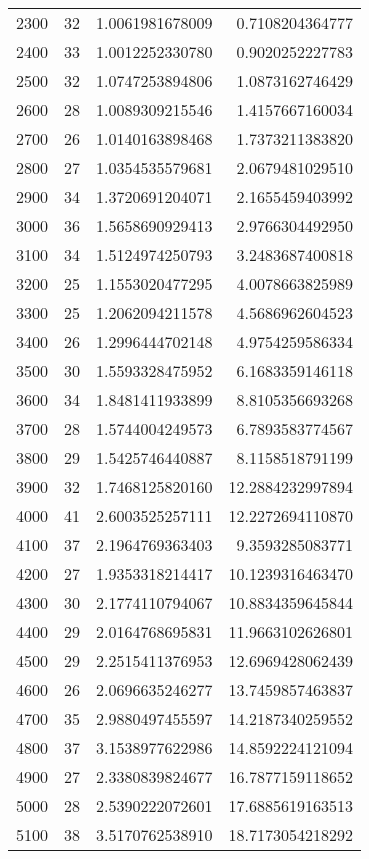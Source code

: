 \begin{longtable}{lrrr}
2300 & 32 & 1.0061981678009 & 0.7108204364777 \\
2400 & 33 & 1.0012252330780 & 0.9020252227783 \\
2500 & 32 & 1.0747253894806 & 1.0873162746429 \\
2600 & 28 & 1.0089309215546 & 1.4157667160034 \\
2700 & 26 & 1.0140163898468 & 1.7373211383820 \\
2800 & 27 & 1.0354535579681 & 2.0679481029510 \\
2900 & 34 & 1.3720691204071 & 2.1655459403992 \\
3000 & 36 & 1.5658690929413 & 2.9766304492950 \\
3100 & 34 & 1.5124974250793 & 3.2483687400818 \\
3200 & 25 & 1.1553020477295 & 4.0078663825989 \\
3300 & 25 & 1.2062094211578 & 4.5686962604523 \\
3400 & 26 & 1.2996444702148 & 4.9754259586334 \\
3500 & 30 & 1.5593328475952 & 6.1683359146118 \\
3600 & 34 & 1.8481411933899 & 8.8105356693268 \\
3700 & 28 & 1.5744004249573 & 6.7893583774567 \\
3800 & 29 & 1.5425746440887 & 8.1158518791199 \\
3900 & 32 & 1.7468125820160 & 12.2884232997894 \\
4000 & 41 & 2.6003525257111 & 12.2272694110870 \\
4100 & 37 & 2.1964769363403 & 9.3593285083771 \\
4200 & 27 & 1.9353318214417 & 10.1239316463470 \\
4300 & 30 & 2.1774110794067 & 10.8834359645844 \\
4400 & 29 & 2.0164768695831 & 11.9663102626801 \\
4500 & 29 & 2.2515411376953 & 12.6969428062439 \\
4600 & 26 & 2.0696635246277 & 13.7459857463837 \\
4700 & 35 & 2.9880497455597 & 14.2187340259552 \\
4800 & 37 & 3.1538977622986 & 14.8592224121094 \\
4900 & 27 & 2.3380839824677 & 16.7877159118652 \\
5000 & 28 & 2.5390222072601 & 17.6885619163513 \\
5100 & 38 & 3.5170762538910 & 18.7173054218292 \\
\end{longtable}
